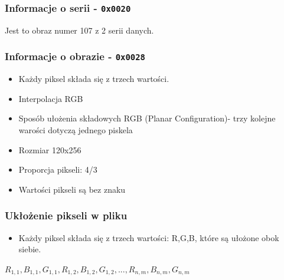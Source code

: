 \begin{frame}
	\frametitle{Informacje o serii - \texttt{0x0020}}
	Jest to obraz numer 107 z 2 serii danych.
\end{frame}

\begin{frame}
  \frametitle{Informacje o obrazie - \texttt{0x0028}}
\begin{itemize}
  \item Każdy piksel składa się z trzech wartości.
  \item Interpolacja RGB
  \item Sposób ułożenia składowych RGB (Planar Configuration)- trzy kolejne warości dotyczą jednego piskela
  \item Rozmiar 120x256
  \item Proporcja pikseli: 4/3
  \item Wartości pikseli są bez znaku
\end{itemize}
\end{frame}

\begin{frame}
  \frametitle{Ukłożenie pikseli w pliku}
  \begin{itemize}
    \item Każdy piksel składa się z trzech wartości: R,G,B, które są ułożone obok siebie.
  \end{itemize}
 $ R_{1,1}, B_{1,1}, G_{1,1}, R_{1,2}, B_{1,2}, G_{1,2}, ..., R_{n,m}, B_{n,m}, G_{n,m} $
\end{frame}
